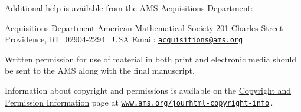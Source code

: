 \goodbreak

Additional help is available from the AMS Acquisitions Department:

\medskip
\begingroup
\obeylines
Acquisitions Department
American Mathematical Society
201 Charles Street
Providence, RI \ 02904-2294 \ USA
Email: \href{mailto:acquisitions@ams.org}{\texttt{acquisitions@ams.org}}
\endgroup
\medskip

Written permission for use of material in both print and electronic media
should be sent to the AMS along with the final manuscript.

Information about copyright and permissions is available on the
\href{http://www.ams.org/publications/journals/help/jourhtml-copyright-info}{Copyright and Permission Information} page at
\href{http://www.ams.org/publications/jourhtml-copyright-info}{\texttt{www.ams.org/jourhtml-copyright-info}}\,.










\backmatter




